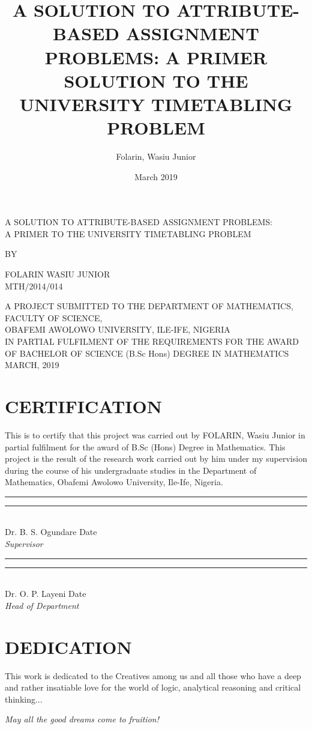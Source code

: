 \documentclass[a4paper,openany]{book}
\title{A SOLUTION TO ATTRIBUTE-BASED ASSIGNMENT PROBLEMS: A PRIMER SOLUTION TO THE UNIVERSITY TIMETABLING PROBLEM}
\date{March 2019}
\author{Folarin, Wasiu Junior}
\begin{document}
    \normalsize
	\frontmatter
	\begin{titlepage}
		\begin{center}
			A SOLUTION TO ATTRIBUTE-BASED ASSIGNMENT PROBLEMS:\\
			A PRIMER TO THE UNIVERSITY TIMETABLING PROBLEM
		\end{center}
		\vfill
		\begin{center}
			BY
		\end{center}
		\vfill
		\begin{center}
			FOLARIN WASIU JUNIOR\\[0.25in]
			MTH/2014/014
		\end{center}
		\vfill
		\begin{center}
			A PROJECT SUBMITTED TO THE DEPARTMENT OF MATHEMATICS, FACULTY OF SCIENCE,\\
			OBAFEMI AWOLOWO UNIVERSITY, ILE-IFE, NIGERIA\\
			IN PARTIAL FULFILMENT OF THE REQUIREMENTS FOR THE AWARD OF 
			BACHELOR OF SCIENCE (B.Sc Hons) DEGREE IN MATHEMATICS\\ \bigskip
			MARCH, 2019
		\end{center}
	\end{titlepage}
	\chapter[CERTIFICATION]{\centering CERTIFICATION}
	This is to certify that this project was carried out by FOLARIN, Wasiu Junior in partial fulfilment for the award of B.Sc (Hons) Degree in Mathematics. This project is the result of the research work carried out by him under my supervision during the course of his undergraduate studies in the Department of Mathematics, Obafemi Awolowo University, Ile-Ife, Nigeria.
	\\[1in]
	\rule{1.5in}{0.1pt} \hfill \rule{1in}{0.4pt}
	\\[2ex]
	Dr. B. S. Ogundare \hfill Date \hspace{4ex}
	\\[1ex]
	\textit{Supervisor}
	\\[1.5in]
	\rule{1.5in}{0.1pt} \hfill \rule{1in}{0.4pt}
	\\[2ex]
	Dr. O. P. Layeni \hfill Date \hspace{4ex}
	\\[1ex]
	\textit{Head of Department}
	
	\chapter[DEDICATION]{ \centering DEDICATION}
		This work is dedicated to the Creatives among us and all those who have a deep and rather insatiable love for the world of logic, analytical reasoning and critical thinking...
		\begin{center}
			\textit{May all the good dreams come to fruition!}
		\end{center}
\end{document}
